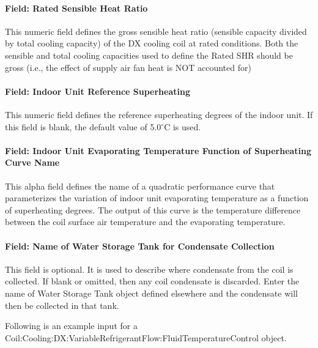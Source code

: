 \paragraph{Field: Rated Sensible Heat Ratio}\label{field-rated-sensible-heat-ratio}

This numeric field defines the gross sensible heat ratio (sensible capacity divided by total cooling capacity) of the DX cooling coil at rated conditions. Both the sensible and total cooling capacities used to define the Rated SHR should be gross (i.e., the effect of supply air fan heat is NOT accounted for)

\paragraph{Field: Indoor Unit Reference Superheating}\label{field-indoor-unit-reference-superheating}

This numeric field defines the reference superheating degrees of the indoor unit. If this field is blank, the default value of 5.0$^\circ$C is used.

\paragraph{Field: Indoor Unit Evaporating Temperature Function of Superheating Curve Name}\label{field-indoor-unit-evaporating-temperature-function-of-superheating-curve-name}

This alpha field defines the name of a quadratic performance curve that parameterizes the variation of indoor unit evaporating temperature as a function of superheating degrees. The output of this curve is the temperature difference between the coil surface air temperature and the evaporating temperature.

\paragraph{Field: Name of Water Storage Tank for Condensate Collection}\label{field-name-of-water-storage-tank-for-condensate-collection-1}

This field is optional. It is used to describe where condensate from the coil is collected. If blank or omitted, then any coil condensate is discarded. Enter the name of Water Storage Tank object defined elsewhere and the condensate will then be collected in that tank.

Following is an example input for a Coil:Cooling:DX:VariableRefrigerantFlow:FluidTemperatureControl object.

